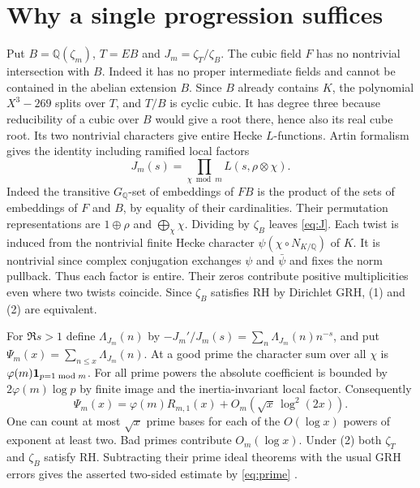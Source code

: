 \documentclass[11pt]{article}
\newcommand{\Q}{\mathbb Q}
\begin{document}
\section{Why a single progression suffices}
Put $B=\Q(\zeta_m)$, $T=EB$ and $J_m=\zeta_T/\zeta_B$. The cubic field $F$ has no nontrivial intersection with $B$. Indeed it has no proper intermediate fields and cannot be contained in the abelian extension $B$. Since $B$ already contains $K$, the polynomial $X^3-269$ splits over $T$, and $T/B$ is cyclic cubic. It has degree three because reducibility of a cubic over $B$ would give a root there, hence also its real cube root. Its two nontrivial characters give entire Hecke $L$-functions. Artin formalism gives the identity including ramified local factors
\begin{equation}\label{eq:J}
 J_m(s)=\prod_{\chi\bmod m}L(s,\rho\otimes\chi).
\end{equation}
Indeed the transitive $G_{\Q}$-set of embeddings of $FB$ is the product of the sets of embeddings of $F$ and $B$, by equality of their cardinalities. Their permutation representations are $1\oplus\rho$ and $\bigoplus_{\chi}\chi$. Dividing by $\zeta_B$ leaves \eqref{eq:J}. Each twist is induced from the nontrivial finite Hecke character $\psi(\chi\circ N_{K/\Q})$ of $K$. It is nontrivial since complex conjugation exchanges $\psi$ and $\bar\psi$ and fixes the norm pullback. Thus each factor is entire. Their zeros contribute positive multiplicities even where two twists coincide. Since $\zeta_B$ satisfies RH by Dirichlet GRH, (1) and (2) are equivalent.

For $\Re s>1$ define $\Lambda_{J_m}(n)$ by $-J_m'/J_m(s)=\sum_n\Lambda_{J_m}(n)n^{-s}$, and put $\Psi_m(x)=\sum_{n\le x}\Lambda_{J_m}(n)$. At a good prime the character sum over all $\chi$ is $\varphi(m){\bf1}_{p=1\bmod m}$. For all prime powers the absolute coefficient is bounded by $2\varphi(m)\log p$ by finite image and the inertia-invariant local factor. Consequently
\begin{equation}\label{eq:prime}
 \Psi_m(x)=\varphi(m)R_{m,1}(x)+O_m(\sqrt x\,\log^2(2x)).
\end{equation}
One can count at most $\sqrt x$ prime bases for each of the $O(\log x)$ powers of exponent at least two. Bad primes contribute $O_m(\log x)$. Under (2) both $\zeta_T$ and $\zeta_B$ satisfy RH. Subtracting their prime ideal theorems with the usual GRH errors gives the asserted two-sided estimate by \eqref{eq:prime} \cite[Thm.~9.1]{LO}.
\end{document}
